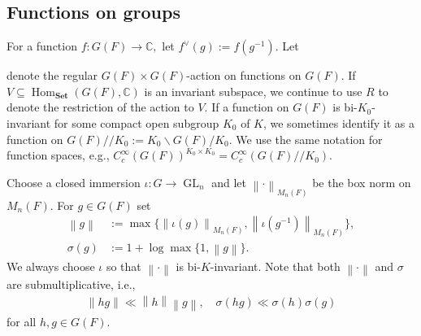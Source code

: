\documentclass[10pt]{amsart}
\newcommand{\norm}[1]{\left\lVert#1\right\rVert} %
\theoremstyle{definition}
\numberwithin{equation}{section}
\DeclareMathOperator{\Hom}{\mathrm{Hom}}
\DeclareMathOperator{\GL}{\mathrm{GL}}
\numberwithin{equation}{subsection}
\newcommand{\CC}{\mathbb{C}}
\begin{document}
\subsection{Functions on groups} 
For a function $f:G(F)\to \CC,$ let $f^\lor(g):=f(g^{-1}).$ Let
\begin{center}
\end{center}
denote the regular $G(F)\times G(F)$-action on functions on $G(F)$. If $V\subseteq \Hom_{\textbf{Set}}(G(F),\mathbb{C})$ is an invariant subspace, we continue to use $R$ to denote the restriction of the action to $V$. If a function on $G(F)$ is bi-$K_0$-invariant for some compact open subgroup $K_0$ of $K$, we sometimes identify it as a function on $G(F)/\!/K_0:=K_0\backslash G(F)/K_0$. We use the same notation for function spaces, e.g., $C^\infty_c(G(F))^{K_0\times K_0}=C^\infty_c(G(F)/\!/K_0).$

Choose a closed immersion $\iota:G\to \GL_n$ and let $\norm{\cdot}_{M_n(F)}$ be the box norm on $M_n(F)$. For $g\in G(F)$ set
\begin{align*}
    \norm{g}&:= \max\big\{\norm{\iota(g)}_{M_n(F)},\norm{\iota(g^{-1})}_{M_n(F)}\big\},\\
    \sigma(g)&:= 1+\log\max\{1,\norm{g}\}.
\end{align*}
We always choose $\iota$ so that $\norm{\cdot}$ is bi-$K$-invariant. Note that both $\norm{\cdot}$ and $\sigma$ are submultiplicative, i.e.,
\begin{align*}
    \norm{hg}\ll \norm{h}\norm{g},\quad \sigma(hg)\ll \sigma(h)\sigma(g)
\end{align*}
for all $h,g\in G(F)$.
\end{document}
